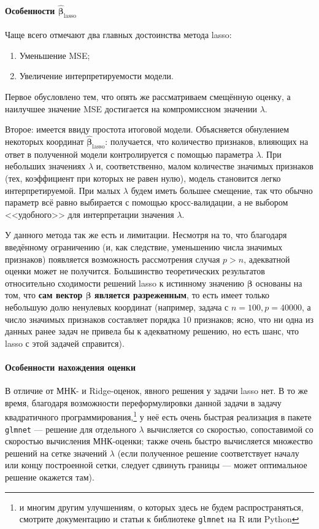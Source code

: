 \documentclass[12pt,a4paper,final]{article}
\newcommand{\betah}{\hat{\bm \beta}}
\newcommand{\betaa}{\bm{\beta}}
\newcommand{\1}{\mathds{1}}
\begin{document}
\paragraph{Особенности $\betah_{\text{lasso}}$}
Чаще всего отмечают два главных достоинства метода lasso:
\begin{enumerate}
	\item Уменьшение MSE;
	\item Увеличение интерпретируемости модели.
\end{enumerate}

Первое обусловлено тем, что опять же рассматриваем смещённую оценку, а наилучшее значение MSE достигается на компромиссном значении $\lambda$. 

Второе: имеется ввиду простота итоговой модели. Объясняется обнулением некоторых координат $\betah_{\text{lasso}}$: получается, что количество признаков, влияющих на ответ в полученной модели контролируется с помощью параметра $\lambda$. При небольших значениях $\lambda$ и, соответственно, малом количестве значимых признаков (тех, коэффициент при которых не равен нулю), модель становится легко интерпретируемой. При малых $\lambda$ будем иметь большее смещение, так что обычно параметр всё равно выбирается с помощью кросс-валидации, а не выбором <<удобного>> для интерпретации значения $\lambda$.

У данного метода так же есть и лимитации. Несмотря на то, что благодаря введённому ограничению (и, как следствие, уменьшению числа значимых признаков) появляется возможность рассмотрения случая $p>n$, адекватной оценки может не получится. 
Большинство теоретических результатов относительно сходимости решений lasso к истинному значению $\betaa$ основаны на том, что \textbf{сам вектор $\betaa$ является разреженным}, то есть имеет только небольшую долю ненулевых координат (например, задача с $n = 100, p = 40000$, а число значимых признаков составляет порядка $10$ признаков; ясно, что ни одна из данных ранее задач не привела бы к адекватному решению, но есть шанс, что lasso с этой задачей справится). 

\paragraph{Особенности нахождения оценки}
В отличие от МНК- и Ridge-оценок, явного решения у задачи lasso нет. В то же время, благодаря возможности переформулировки данной задачи в задачу квадратичного программирования,\footnote{и многим другим улучшениям, о которых здесь не будем распространяться, смотрите документацию и статьи к библиотеке \texttt{glmnet} на R или Python} у неё есть очень быстрая реализация в пакете \texttt{glmnet} --- решение для отдельного $\lambda$ вычисляется со скоростью, сопоставимой со скоростью вычисления МНК-оценки; также очень быстро вычисляется множество решений на сетке значений $\lambda$ (если полученное решение соответствует началу или концу построенной сетки, следует сдвинуть границы --- может оптимальное решение окажется там).
\end{document}
